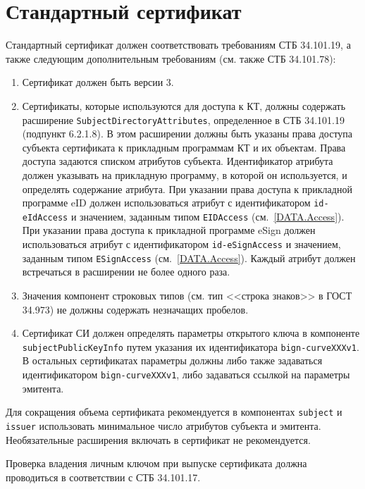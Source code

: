 \section{Стандартный сертификат}\label{CERTS.Std}

Стандартный сертификат должен соответствовать требованиям СТБ 34.101.19, 
а также следующим дополнительным требованиям ({см. также СТБ 34.101.78}):  

\begin{enumerate}
\item
Сертификат должен быть версии 3.

\item
Сертификаты, которые используются для доступа к КТ, должны содержать 
расширение \verb|SubjectDirectoryAttributes|,
определенное в СТБ 34.101.19 (подпункт 6.2.1.8). 
В этом расширении должны быть указаны права доступа субъекта сертификата к 
прикладным программам КТ и их объектам. Права доступа задаются списком 
атрибутов субъекта. Идентификатор атрибута должен указывать на прикладную 
программу, в которой он используется, и определять содержание атрибута. 
При указании права доступа к прикладной программе eID должен использоваться атрибут с 
идентификатором \verb|id-eIdAccess| и значением, 
заданным типом \verb|EIDAccess| (см.~\ref{DATA.Access}). 
При указании права доступа к прикладной программе eSign 
должен использоваться атрибут с идентификатором \verb|id-eSignAccess| и значением, 
заданным типом \verb|ESignAccess| (см.~\ref{DATA.Access}). 
Каждый атрибут должен встречаться в расширении не более одного раза.

\item
Значения компонент строковых типов (см. тип <<строка знаков>> в ГОСТ 34.973) 
не должны содержать незначащих пробелов. 

\item
Сертификат СИ должен определять параметры открытого ключа в компоненте 
\verb|subjectPublicKeyInfo| путем указания их идентификатора \verb|bign-curveXXXv1|. 
В остальных сертификатах параметры должны либо также задаваться 
идентификатором \verb|bign-curveXXXv1|, либо задаваться ссылкой на 
параметры эмитента. 
\end{enumerate}

Для сокращения объема сертификата рекомендуется в компонентах \verb|subject| и 
\verb|issuer| использовать минимальное число атрибутов субъекта и эмитента. 
Необязательные расширения включать в сертификат не рекомендуется. 

Проверка владения личным ключом при выпуске сертификата должна проводиться 
в соответствии с СТБ 34.101.17. 

